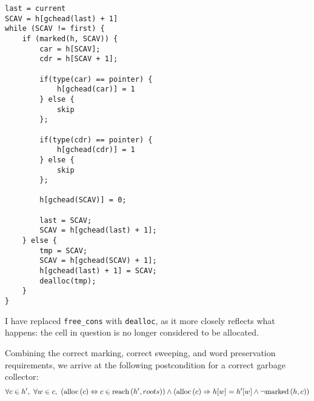 \begin{lstlisting}
last = current
SCAV = h[gchead(last) + 1]
while (SCAV != first) {
    if (marked(h, SCAV)) {
        car = h[SCAV];
        cdr = h[SCAV + 1];

        if(type(car) == pointer) {
            h[gchead(car)] = 1
        } else {
            skip
        };

        if(type(cdr) == pointer) {
            h[gchead(cdr)] = 1
        } else {
            skip
        };

        h[gchead(SCAV)] = 0;

        last = SCAV;
        SCAV = h[gchead(last) + 1];
    } else {
        tmp = SCAV;
        SCAV = h[gchead(SCAV) + 1];
        h[gchead(last) + 1] = SCAV;
        dealloc(tmp);
    }
}
\end{lstlisting}

I have replaced \texttt{free\_cons} with \texttt{dealloc}, as it more
closely reflects what happens: the \gls{cell} in question is no longer
considered to be allocated.

Combining the correct marking, correct sweeping, and word preservation
requirements, we arrive at the following postcondition for a correct
\gls{garbage collector}: \[\forall c \in h',\ \forall w \in c,\
(\mathrm{alloc}\left(c\right) \Leftrightarrow c \in \mathrm{reach}\left(h', roots\right)) \land (\mathrm{alloc}\left(c\right) \Rightarrow
h[w] = h'[w] \land \lnot\mathrm{marked}\left(h, c\right))\]

